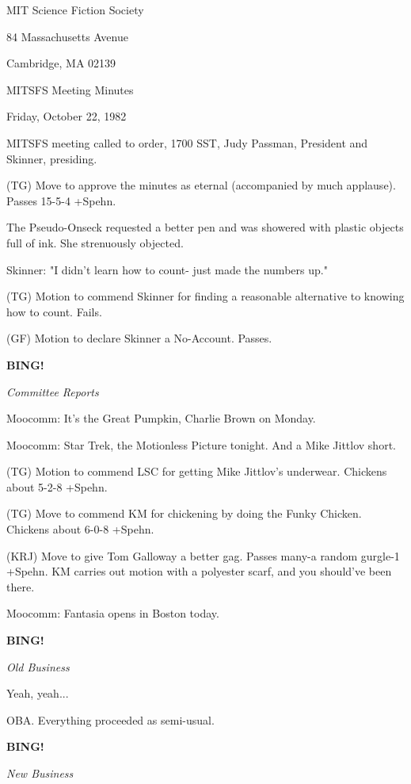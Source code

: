 \documentclass[12pt]{article}
\newcommand{\bing}{{\bf BING!} }
\newcommand{\goto}[1]{\bing \vskip 12pt \centerline{{\em{#1}}}}
\begin{document}
\begin{center}

MIT Science Fiction Society 

84 Massachusetts Avenue

Cambridge, MA 02139

\vspace{12pt}

MITSFS Meeting Minutes 

Friday, October 22, 1982

\end{center}
 
\vspace{18pt}

\setlength{\parskip}{6pt}

\noindent
MITSFS meeting called to order, 1700 SST,
Judy Passman, President and Skinner, presiding.

(TG) Move to approve the minutes as eternal (accompanied by much applause). Passes 15-5-4 +Spehn.

The Pseudo-Onseck requested a better pen and was showered with plastic objects full of ink. She strenuously objected.

Skinner: "I didn't learn how to count- just made the numbers up."

(TG) Motion to commend Skinner for finding a reasonable alternative to knowing how to count. Fails.

(GF) Motion to declare Skinner a No-Account. Passes.

\goto{Committee Reports}

Moocomm: It's the Great Pumpkin, Charlie Brown on Monday.

Moocomm: Star Trek, the Motionless Picture tonight. And a Mike Jittlov short.

(TG) Motion to commend LSC for getting Mike Jittlov's underwear. Chickens about 5-2-8 +Spehn.

(TG) Move to commend KM for chickening by doing the Funky Chicken. Chickens about 6-0-8 +Spehn.

(KRJ) Move to give Tom Galloway a better gag. Passes many-a random gurgle-1 +Spehn. KM carries out motion with a polyester scarf, and you should've been there.

Moocomm: Fantasia opens in Boston today.

\goto{Old Business}

Yeah, yeah...

OBA. Everything proceeded as semi-usual.

\goto{New Business}
\end{document}

